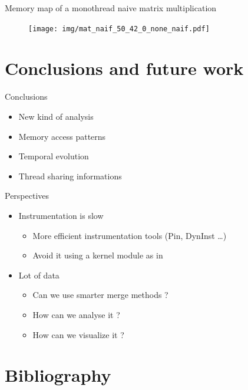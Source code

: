 \documentclass[xcolor={usenames,dvipsnames}]{beamer}
\newcommand{\sectiontitle}{}
\newcommand{\newsection}[1]{\renewcommand{\sectiontitle}{#1}\section{#1}}
\newcommand{\newHsection}[1]{\renewcommand{\sectiontitle}{#1}\section*{#1}}
\begin{document}
\begin{frame}{Memory map of a monothread naive matrix multiplication}
    \begin{figure}
        \centering
        \texttt{[image: img/mat\_naif\_50\_42\_0\_none\_naif.pdf]}
    \end{figure}
\end{frame}

\newsection{Conclusions and future work}

\begin{frame}{Conclusions}
    \begin{itemize}
        \item New kind of analysis
        \item Memory access patterns
        \item Temporal evolution
        \item Thread sharing informations
    \end{itemize}
\end{frame}

\setcounter{finalframe}{\value{framenumber}}
\begin{frame}{Perspectives}
    \begin{itemize}
        \item Instrumentation is slow
            \begin{itemize}
                \item More efficient instrumentation tools (Pin, DynInst
                    \dots)
                \item Avoid it using a kernel module as in \cite{Cruz12Using}
            \end{itemize}
        \item Lot of data
            \begin{itemize}
                \item Can we use smarter merge methods ?
                \item How can we analyse it ?
                \item How can we visualize it ?
            \end{itemize}
    \end{itemize}
\end{frame}


\newHsection{Bibliography}
%




\end{document}
